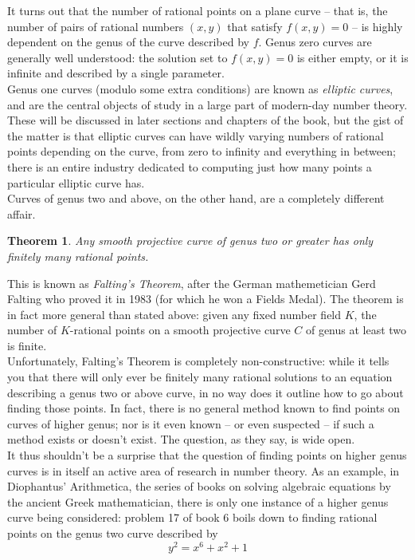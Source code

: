 \documentclass{book}
\theoremstyle{plain}
\newtheorem{theorem}{Theorem}[section]
\theoremstyle{definition}
\numberwithin{equation}{section}
\numberwithin{figure}{section}
\numberwithin{table}{section}
\begin{document}
It turns out that the number of rational points on a plane curve -- that is, the number of pairs of rational numbers $(x,y)$ that satisfy $f(x,y)=0$ -- is highly dependent on the genus of the curve described by $f$. Genus zero curves are generally well understood: the solution set to $f(x,y)=0$ is either empty, or it is infinite and described by a single parameter. \\

Genus one curves (modulo some extra conditions) are known as {\it elliptic curves}, and are the central objects of study in a large part of modern-day number theory. These will be discussed in later sections and chapters of the book, but the gist of the matter is that elliptic curves can have wildly varying numbers of rational points depending on the curve, from zero to infinity and everything in between; there is an entire industry dedicated to computing just how many points a particular elliptic curve has. \\

Curves of genus two and above, on the other hand, are a completely different affair.

\begin{theorem}
Any smooth projective curve of genus two or greater has only finitely many rational points.
\end{theorem}

This is known as {\it Falting's Theorem}, after the German mathemetician Gerd Falting who proved it in 1983 (for which he won a Fields Medal). The theorem is in fact more general than stated above: given any fixed number field $K$, the number of $K$-rational points on a smooth projective curve $C$ of genus at least two is finite. \\

Unfortunately, Falting's Theorem is completely non-constructive: while it tells you that there will only ever be finitely many rational solutions to an equation describing a genus two or above curve, in no way does it outline how to go about finding those points. In fact, there is no general method known to find points on curves of higher genus; nor is it even known -- or even suspected -- if such a method exists or doesn't exist. The question, as they say, is wide open. \\

It thus shouldn't be a surprise that the question of finding points on higher genus curves is in itself an active area of research in number theory. As an example, in Diophantus' Arithmetica, the series of books on solving algebraic equations by the ancient Greek mathematician, there is only one instance of a higher genus curve being considered: problem 17 of book 6 boils down to finding rational points on the genus two curve described by
\[ y^2 = x^6 + x^2 + 1 \]
\end{document}

